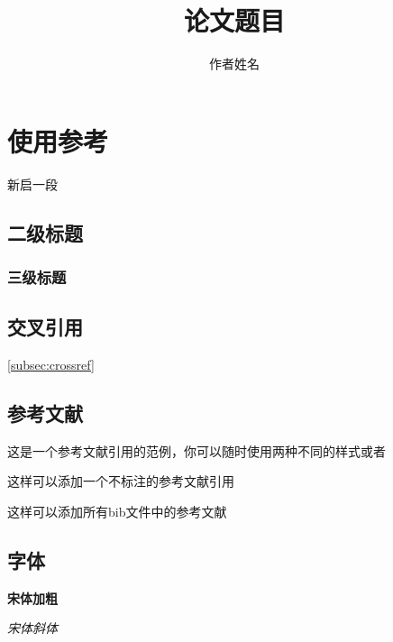 \documentclass[supercite]{HustGSReport}
\title{论文题目} %
\author{作者姓名} %
\begin{document}
\maketitle

\tableofcontents
\clearpage%


\section{使用参考}

\par 新启一段

\subsection{二级标题}
\subsubsection{三级标题}

\subsection{交叉引用}\label{subsec:crossref}

\autoref{subsec:crossref}
	
\subsection{参考文献}

这是一个参考文献引用的范例\cite{Stone_1998}，你可以随时使用两种不同的样式或者\supercite{Stone_1998}
	
这样可以添加一个不标注的参考文献引用\nocite{Stone_1998}
	
这样可以添加所有bib文件中的参考文献\nocite{*}




\subsection{字体}

{\songti \bfseries 宋体加粗}
	
{\songti \itshape 宋体斜体}
	
\end{document}
